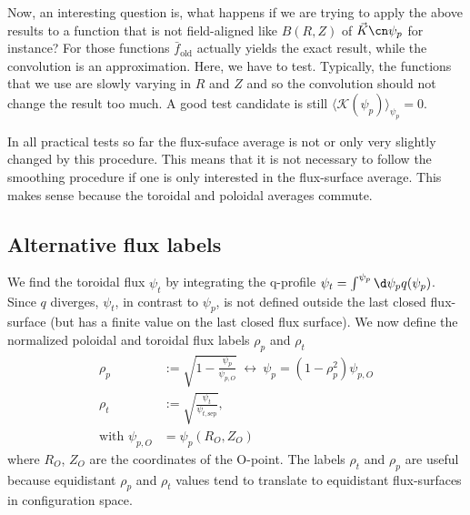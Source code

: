Now, an interesting question is, what happens if we are trying to apply the above
results to a function that is not field-aligned like $B(R,Z)$ of $\vec K\cn\psi_p$ for instance? For those functions $\bar f_\mathrm{old}$ actually yields the exact
result, while the convolution is an approximation.
Here, we have to test.
Typically, the functions that we use are slowly varying in $R$ and $Z$ and
so the convolution should not change the result too much.
A good test candidate is still $\langle \mathcal K(\psi_p)\rangle_{\psi_p}=0$.

In all practical tests so far the flux-suface average is not or only very slightly changed by this procedure.
This means that it is not
necessary to follow the smoothing procedure if one is only interested in the flux-surface average.
This makes sense because the toroidal and poloidal averages commute.

\subsection{Alternative flux labels} \label{sec:alternative}
We find the toroidal flux $\psi_t$ by integrating the q-profile $\psi_t = \int^{\psi_p} \d\psi_p q(\psi_p)$. Since $q$ diverges, $\psi_t$, in contrast to $\psi_p$,
is not defined outside the last closed flux-surface (but has a finite value on the last closed flux surface). We now define the normalized poloidal and toroidal flux labels $\rho_p$ and $\rho_t$
\begin{align}
    \rho_p&:= \sqrt{1-\frac{\psi_p }{\psi_{p,O}}} \ \leftrightarrow\ \psi_p = (1-\rho_p^2)\psi_{p,O} \\
    \rho_t&:= \sqrt{\frac{\psi_t}{\psi_{t,\mathrm{sep}}}},\\
    \text{with }\psi_{p,O} &= \psi_p(R_O, Z_O)%
\end{align}
where $R_O$, $Z_O$ are the coordinates of the O-point.
The labels $\rho_t$ and $\rho_p$ are useful because
equidistant $\rho_p$ and $\rho_t$ values tend to translate to equidistant flux-surfaces
in configuration space.

